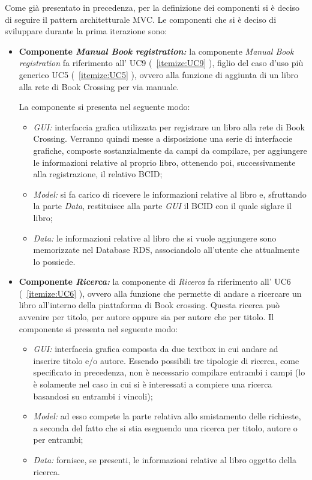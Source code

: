 Come già presentato in precedenza, per la definizione dei componenti si è deciso di seguire il pattern architetturale MVC. 
Le componenti che si è deciso di sviluppare durante la prima iterazione sono: 
\begin{itemize}
	\item \textbf{Componente \textit{Manual Book registration:}} la componente \textit{Manual Book registration} fa riferimento all’ UC9 (~\ref{itemize:UC9} ), figlio del caso d'uso più generico UC5 (~\ref{itemize:UC5} ), ovvero alla funzione di aggiunta di un libro alla rete di Book Crossing per via manuale. 
	
	La componente si presenta nel seguente modo:
	\begin{itemize}
		\item \textit{GUI:} interfaccia grafica utilizzata per registrare un libro alla rete di Book Crossing. Verranno quindi messe a disposizione una serie di interfaccie grafiche, composte sostanzialmente da campi da compilare, per aggiungere le informazioni relative al proprio libro, ottenendo poi, successivamente alla registrazione, il relativo BCID;
		\item \textit{Model:} si fa carico di ricevere le informazioni relative al libro e, sfruttando la parte \textit{Data}, restituisce alla parte \textit{GUI} il BCID con il quale siglare il libro;
		\item \textit{Data:} le informazioni relative al libro che si vuole aggiungere sono memorizzate nel Database RDS, associandolo all'utente che attualmente lo possiede. 
	\end{itemize}
	\item \textbf{Componente \textit{Ricerca:}}  la componente di \textit{Ricerca} fa riferimento all’ UC6 (~\ref{itemize:UC6} ),
	ovvero alla funzione che permette di andare a ricercare un libro all'interno della piattaforma di Book crossing.
	Questa ricerca può avvenire per titolo, per autore oppure sia per autore che per titolo. Il componente si presenta nel seguente modo:
	\begin{itemize}
		\item \textit{GUI:} interfaccia grafica composta da due textbox in cui andare ad inserire titolo e/o autore. Essendo possibili tre tipologie di ricerca, come specificato in precedenza, non è necessario compilare entrambi i campi (lo è solamente nel caso in cui si è interessati a compiere una ricerca basandosi su entrambi i vincoli);
		\item \textit{Model:} ad esso compete la parte relativa allo smistamento delle richieste, a seconda del fatto che si stia eseguendo una ricerca per titolo, autore o per entrambi;
		\item \textit{Data:} fornisce, se presenti, le informazioni relative al libro oggetto della ricerca.
	\end{itemize}
\end{itemize}